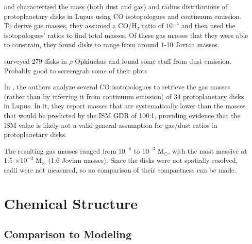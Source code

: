\citet{Ansdell2016} and \citet{Ansdell2018} characterized the mass (both dust and gas) and radius distributions of protoplanetary disks in Lupus using CO isotopologues and continuum emission. To derive gas masses, they assumed a CO/H$_2$ ratio of $10^{-4}$ and then used the isotopologues' ratios to find total masses. Of these gas masses that they were able to constrain, they found disks to range from around 1-10 Jovian masses.


\citet{Williams2019} surveyed 279 disks in $\rho$ Ophiuchus and found some stuff from dust emission. Probably good to screengrab some of their plots


In \citet{Miotello2016}, the authors analyze several CO isotopologues to retrieve the gas masses (rather than by inferring it from continuum emission) of 34 protoplanetary disks in Lupus. In it, they report masses that are systematically lower than the masses that would be predicted by the ISM GDR of 100:1, providing evidence that the ISM value is likely not a valid general assumption for gas/dust ratios in protoplanetary disks.

The resulting gas masses ranged from $10^{-5}$ to $10^{-3}$ M$_\odot$, with the most massive at 1.5 $\times 10^{-3}$ M$_\odot$ (1.6 Jovian masses). Since the disks were not spatially resolved, radii were not measured, so no comparison of their compactness can be made.









\section{Chemical Structure}



\subsection{Comparison to Modeling}


